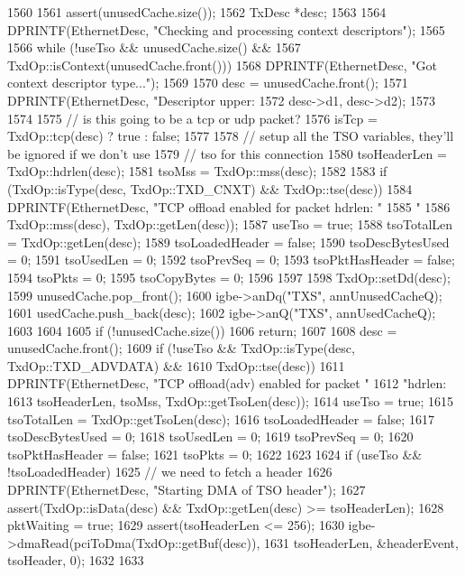 \begin{DoxyCode}
1560 {
1561     assert(unusedCache.size());
1562     TxDesc *desc;
1563     
1564     DPRINTF(EthernetDesc, "Checking and  processing context descriptors\n");
1565 
1566     while (!useTso && unusedCache.size() &&
1567            TxdOp::isContext(unusedCache.front())) {
1568         DPRINTF(EthernetDesc, "Got context descriptor type...\n");
1569 
1570         desc = unusedCache.front();
1571         DPRINTF(EthernetDesc, "Descriptor upper: %
1572                 desc->d1, desc->d2);
1573 
1574         
1575         // is this going to be a tcp or udp packet?
1576         isTcp = TxdOp::tcp(desc) ? true : false;
1577 
1578         // setup all the TSO variables, they'll be ignored if we don't use 
1579         // tso for this connection
1580         tsoHeaderLen = TxdOp::hdrlen(desc);
1581         tsoMss  = TxdOp::mss(desc);
1582 
1583         if (TxdOp::isType(desc, TxdOp::TXD_CNXT) && TxdOp::tse(desc)) {
1584             DPRINTF(EthernetDesc, "TCP offload enabled for packet hdrlen: "
1585                     "%
1586                     TxdOp::mss(desc), TxdOp::getLen(desc));
1587             useTso = true;
1588             tsoTotalLen = TxdOp::getLen(desc);
1589             tsoLoadedHeader = false;
1590             tsoDescBytesUsed = 0;
1591             tsoUsedLen = 0;
1592             tsoPrevSeq = 0;
1593             tsoPktHasHeader = false;
1594             tsoPkts = 0;
1595             tsoCopyBytes = 0;
1596         }
1597 
1598         TxdOp::setDd(desc);
1599         unusedCache.pop_front();
1600         igbe->anDq("TXS", annUnusedCacheQ);
1601         usedCache.push_back(desc);
1602         igbe->anQ("TXS", annUsedCacheQ);
1603     }
1604 
1605     if (!unusedCache.size())
1606         return;
1607 
1608     desc = unusedCache.front();
1609     if (!useTso && TxdOp::isType(desc, TxdOp::TXD_ADVDATA) && 
1610         TxdOp::tse(desc)) {
1611         DPRINTF(EthernetDesc, "TCP offload(adv) enabled for packet "
1612                 "hdrlen: %
1613                 tsoHeaderLen, tsoMss, TxdOp::getTsoLen(desc));
1614         useTso = true;
1615         tsoTotalLen = TxdOp::getTsoLen(desc);
1616         tsoLoadedHeader = false;
1617         tsoDescBytesUsed = 0;
1618         tsoUsedLen = 0;
1619         tsoPrevSeq = 0;
1620         tsoPktHasHeader = false;
1621         tsoPkts = 0;
1622     }
1623 
1624     if (useTso && !tsoLoadedHeader) {
1625         // we need to fetch a header
1626         DPRINTF(EthernetDesc, "Starting DMA of TSO header\n");
1627         assert(TxdOp::isData(desc) && TxdOp::getLen(desc) >= tsoHeaderLen);
1628         pktWaiting = true;
1629         assert(tsoHeaderLen <= 256);
1630         igbe->dmaRead(pciToDma(TxdOp::getBuf(desc)),
1631                       tsoHeaderLen, &headerEvent, tsoHeader, 0);
1632     }
1633 }
\end{DoxyCode}
